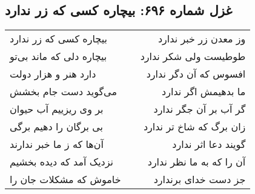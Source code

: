 \begin{center}
\section*{غزل شماره ۶۹۶: بیچاره کسی که زر ندارد}
\label{sec:0696}
\begin{longtable}{l p{0.5cm} r}
بیچاره کسی که زر ندارد
&&
وز معدن زر خبر ندارد
\\
بیچاره دلی که ماند بی‌تو
&&
طوطیست ولی شکر ندارد
\\
دارد هنر و هزار دولت
&&
افسوس که آن دگر ندارد
\\
می‌گوید دست جام بخشش
&&
ما بدهیمش اگر ندارد
\\
بر وی ریزییم آب حیوان
&&
گر آب بر آن جگر ندارد
\\
بی برگان را دهیم برگی
&&
زان برگ که شاخ تر ندارد
\\
آن‌ها که ز ما خبر ندارند
&&
گویند دعا اثر ندارد
\\
نزدیک آمد که دیده بخشیم
&&
آن را که به ما نظر ندارد
\\
خاموش که مشکلات جان را
&&
جز دست خدای برندارد
\\
\end{longtable}
\end{center}

